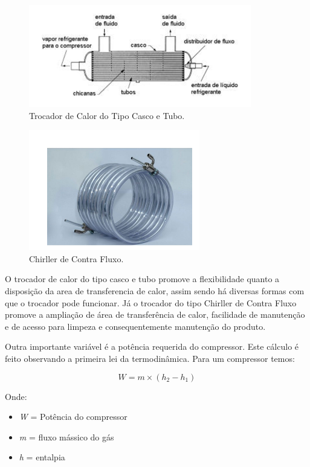 			\begin{figure}[H]
				\centering
				\includegraphics[scale= 0.7]{figuras/trocador-calor.png}
				\caption{Trocador de Calor do Tipo Casco e Tubo.}
				\label{trocador-calor}
			\end{figure}				


			\begin{figure}[H]
				\centering
				\includegraphics[scale= 0.7]{figuras/chirller.png}
				\caption{Chirller de Contra Fluxo.}
				\label{chirller}
			\end{figure}				
			
			O trocador de calor do tipo casco e tubo promove a flexibilidade quanto a disposição da area de transferencia de calor, assim sendo há diversas formas com que o trocador pode funcionar. Já o trocador do tipo Chirller de Contra Fluxo promove a ampliação de área de transferência de calor, facilidade de manutenção e de acesso para limpeza e consequentemente manutenção do produto. 
			
			Outra importante variável é a potência requerida do compressor. Este cálculo é feito observando a primeira lei da termodinâmica. Para um compressor temos:

			\begin{equation} 
				\label{eq4}
				W = m \times {(h_{2} - h_{1})}
			\end{equation}

			Onde:
				\begin{itemize}
					\item \textit{W} = Potência do compressor
					\item \textit{m} = fluxo mássico do gás
					\item \textit{h} = entalpia
				\end{itemize}

